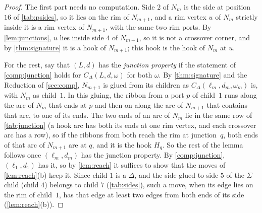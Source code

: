 \documentclass[11pt]{amsart}
\theoremstyle{definition}
\theoremstyle{remark}
\begin{document}
\begin{proof}
The first part needs no computation. Side $2$ of $N_m$ is the side at position $16$ of \cref{tab:psides}, so it lies on
the rim of $N_{m+1}$, and a rim vertex $u$ of $N_m$ strictly inside it is a rim vertex of $N_{m+1}$, with the same two
rim ports. By \cref{lem:junctions}, $u$ lies inside side $4$ of $N_{m+1}$, so it is not a crossover corner, and by
\cref{thm:signature} it is a hook of $N_{m+1}$; this hook is the hook of $N_m$ at $u$.

For the rest, say that $(L,d)$ has the \emph{junction property} if the statement of \cref{comp:junction} holds for
$C_\Delta(L,d,\omega)$ for both $\omega$. By \cref{thm:signature} and the Reduction of \cref{sec:comp}, $N_{m+1}$ is
glued from its children as $C_\Delta(\ell_m,d_m,\omega_m)$ is, with $N_m$ as child~$1$. In this gluing, the ribbon from
a port $p$ of child~$1$ runs along the arc of $N_m$ that ends at $p$ and then on along the arc of $N_{m+1}$ that
contains that arc, to one of its ends. The two ends of an arc of $N_m$ lie in the same row of \cref{tab:junction} (a
hook arc has both its ends at one rim vertex, and each crossover arc has a row), so if the ribbons from both reach the
rim at junction~$q$, both ends of that arc of $N_{m+1}$ are at $q$, and it is the hook $H_q$. So the rest of the lemma
follows once
$(\ell_m,d_m)$ has the junction property. By \cref{comp:junction}, $(\ell_1,d_1)$ has it, so by \cref{lem:reach} it
suffices to show that the moves of \cref{lem:reach}(b) keep it. Since child $1$ is a $\Delta$, and the side glued to
side $5$ of the $\Sigma$ child (child $4$) belongs to child $7$ (\cref{tab:sides}), such a move, when its edge lies on
the rim of child~$1$, has that edge at least two edges from both ends of its side (\cref{lem:reach}(b)).


\end{proof}
\end{document}
